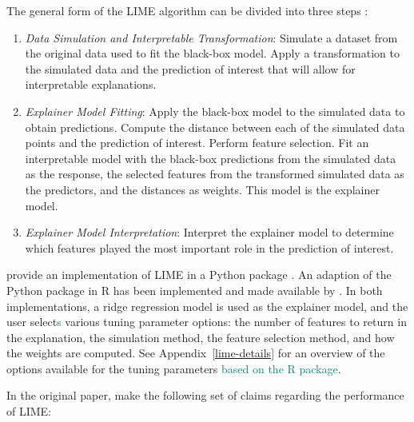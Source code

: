 \documentclass[AMS,STIX2COL]{WileyNJD-v2}\usepackage[]{graphicx}\usepackage[]{color}
\newcommand{\kge}[1]{\textcolor{teal}{#1}}
\renewcommand{\sout}[1]{\unskip}
\begin{document}
The general form of the LIME algorithm can be divided into three steps \citep[see also][]{laugel:2018}:

\begin{enumerate}

\item \emph{Data Simulation and Interpretable Transformation}: Simulate a dataset from the original data used to fit the black-box model. Apply a transformation to the simulated data and the prediction of interest that will allow for interpretable explanations.

\item \emph{Explainer Model Fitting}: Apply the black-box model to the simulated data to obtain predictions. Compute the distance between each of the simulated data points and the prediction of interest. Perform feature selection. Fit an interpretable model with the black-box predictions from the simulated data as the response, the selected features from the transformed simulated data as the predictors, and the distances as weights. This model is the explainer model.

\item \emph{Explainer Model Interpretation}: Interpret the explainer model to determine which features played the most important role in the prediction of interest.

\end{enumerate}

\citet{ribeiro:2016} provide an implementation of LIME in a Python package \cite{ribeiro:2020}. An adaption of the Python package in R has been implemented and made available by \citet{pedersen:2020}. In both implementations, a ridge regression model is used as the explainer model, and the user \sout{is asked to} select\kge{s} various tuning parameter options: the number of features to return in the explanation, the simulation method, the feature selection method, and how the weights are computed. \sout{The discussion of parameter choices and implementation details of LIME in this paper are based on the R package.} See Appendix~\ref{lime-details} for an overview of the options available for the tuning parameters \kge{based on the R package}.

In the original paper, \citet{ribeiro:2016} make the following set of claims regarding the performance of LIME:
\end{document}
